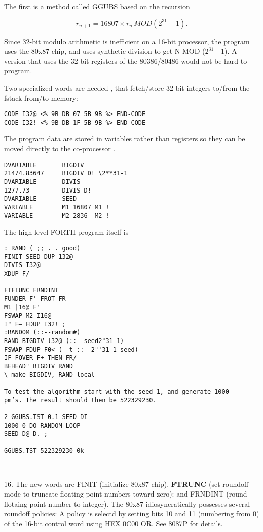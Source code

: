 The first is a method called GGUBS  based on the recursion

\begin{equation}
    r_{n+1} = 16807 \times{} r_n \, MOD (2^{31} - 1) .\nonumber
\end{equation}

Since 32-bit modulo arithmetic is inefficient on a 16-bit processor, the
program uses the 80x87 chip, and uses synthetic division
to get N MOD ($2^{31}$ - 1). A version that uses the 32-bit registers
of the 80386/80486 would not be hard to program.

Two specialized words are needed 
, that fetch/store 32-bit integers to/from the fstack from/to memory:

\begin{verbatim}
CODE I32@ <% 9B DB 07 5B 9B %> END-CODE
CODE I32! <% 9B DB 1F 5B 9B %> END-CODE
\end{verbatim}

The program data are stored in variables rather than registers so
they can be moved directly to the co-processor  .

\begin{verbatim}
DVARIABLE       BIGDIV
21474.83647     BIGDIV D! \2**31-1
DVARIABLE       DIVIS
1277.73         DIVIS D!
DVARIABLE       SEED
VARIABLE        M1 16807 M1 !
VARIABLE        M2 2836  M2 !
\end{verbatim}

The high-level FORTH program itself is

\begin{verbatim}
: RAND ( ;; . . good)
FINIT SEED DUP 132@
DIVIS I32@
XDUP F/

FTFIUNC FRNDINT
FUNDER F' FROT FR-
M1 |16@ F'
FSWAP M2 I16@
I" F— FDUP I32! ;
:RANDOM (::--random#)
RAND BIGDIV l32@ (::--seed2"31-1)
FSWAP FDUP F0< (--t ::--2"'31-1 seed)
IF FOVER F+ THEN FR/
BEHEAD" BIGDIV RAND
\ make BIGDIV, RAND local

To test the algorithm start with the seed 1, and generate 1000
pm’s. The result should then be 522329230.

2 GGUBS.TST 0.1 SEED DI
1000 0 DO RANDOM LOOP
SEED D@ D. ;

GGUBS.TST 522329230 0k

 
\end{verbatim}

16. The new words are FINIT (initialize 80x87 chip). \textbf{FTRUNC} (set
roundoff mode to truncate ﬂoating point numbers toward zero): and FRNDINT
(round flotaing point number to integer). The
80x87 idiosyncratically possesses several roundoff policies: A policy is selectd by setting bits 10
and 11 (numbering from 0) of the 16-bit control word using HEX 0C00 OR. See 8087P for
details.

